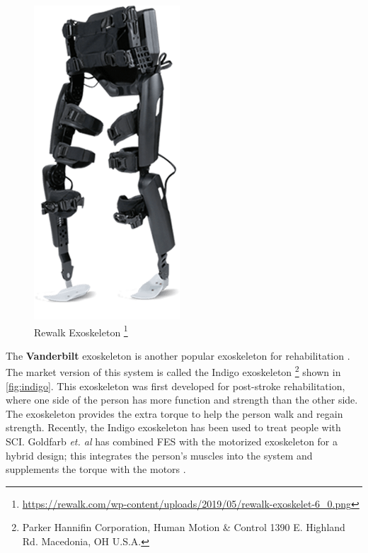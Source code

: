 \begin{figure}[H]
    \centering
    \includegraphics[scale=0.4]{images/background/rewalk-exoskelet.png}
   \caption[Rewalk Exoskeleton]{Rewalk Exoskeleton  \protect\footnote{\url{ https://rewalk.com/wp-content/uploads/2019/05/rewalk-exoskelet-6_0.png}}}
    \label{fig:rewalk}
\end{figure}


 The \textbf{Vanderbilt} exoskeleton is another popular exoskeleton for rehabilitation \cite{gasser2017design}. The market version of this system is called the Indigo exoskeleton \footnote{Parker Hannifin Corporation, Human Motion & Control 1390 E. Highland Rd. Macedonia, OH U.S.A.} shown in \autoref{fig:indigo}. This exoskeleton was first developed for post-stroke rehabilitation, where one side of the person has more function and strength than the other side. The exoskeleton provides the extra torque to help the person walk and regain strength. Recently, the Indigo exoskeleton has been used to treat people with SCI. Goldfarb \textit{et. al} has combined FES with the motorized exoskeleton for a hybrid design; this integrates the person's muscles into the system and supplements the torque with the motors \cite{ha2012enhancing}. 
 
